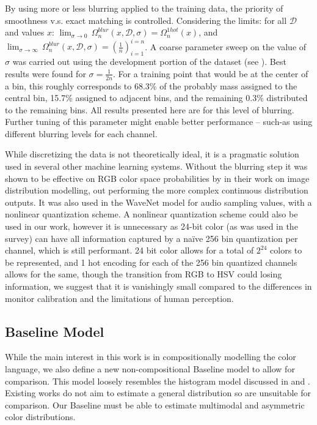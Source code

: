 \documentclass[11pt,a4paper]{article}
\newcommand{\parencite}{\citep}
\newcommand{\textcite}{\cite}
\begin{document}
By using more or less blurring applied to the training data, the priority of smoothness v.s. exact matching is controlled.
Considering the limits:
for all $\mathcal{D}$ and values $x$: 
\mbox{$\lim_{\sigma \to 0}\, \Omega_n^{blur}(x, \mathcal{D}, \sigma) = \Omega_n^{1hot}(x)$},
and \mbox{$\lim_{\sigma \to \infty}\, \Omega_n^{blur}(x, \mathcal{D}, \sigma) =  \left(\frac{1}{n}\right)_{i=1}^{i=n}$}.
A coarse parameter sweep on the value of $\sigma$ was carried out using the development portion of the dataset (see ).
Best results were found for $\sigma = \frac{1}{2n}$.
For a training point that would be at the center of a bin, this roughly corresponds to 68.3\% of the probably mass assigned to the central bin, 15.7\% assigned to adjacent bins, and the remaining 0.3\% distributed to the remaining bins.
All results presented here are for this level of blurring.
Further tuning of this parameter might enable better performance -- such-as using different blurring levels for each channel.

While discretizing the data is not theoretically ideal, it is a pragmatic solution used in several other machine learning systems.
Without the blurring step it was shown to be effective on RGB color space probabilities by \textcite{oord2016pixel} in their work on image distribution modelling, out performing the more complex continuous distribution outputs. 
It was also used in the WaveNet model \parencite{DBLP:journals/corr/OordDZSVGKSK16} for audio sampling values, with a nonlinear quantization scheme.
A nonlinear quantization scheme could also be used in our work,
however it is unnecessary as 24-bit color (as was used in the survey) can have all information captured by a na\"ive 256 bin quantization per channel, which is still performant.
24 bit color allows for a total of $2^{24}$ colors to be represented, and 1 hot encoding for each of the 256 bin quantized channels allows for the same, though the transition from RGB to HSV could losing information, we suggest that it is vanishingly small compared to the differences in monitor calibration and the limitations of human perception.


\subsection{Baseline Model}\label{sec:Baseline-model}
While the main interest in this work is in compositionally modelling the color language,
we also define a new non-compositional Baseline model to allow for comparison.
This model loosely resembles the histogram model discussed in \textcite{meomcmahanstone:color} and \textcite{mcmahan2015bayesian}.
Existing works do not aim to estimate a general distribution so are unsuitable for comparison.
Our Baseline must be able to estimate multimodal and asymmetric color distributions.
\end{document}
